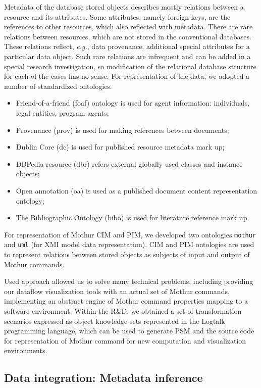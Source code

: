 \documentclass[a4paper]{jpconf}
\begin{document}
Metadata of the database stored objects describes mostly relations between a resource and its attributes.  Some attributes, namely foreign keys, are the references to other resources, which also reflected with metadata.  There are rare relations between resources, which are not stored in the conventional databases.  These relations reflect, \emph{e.g.}, data provenance, additional special attributes for a particular data object.  Such rare relations are infrequent and can be added in a special research investigation, so modification of the relational database structure for each of the cases has no sense. For representation of the data, we adopted a number of standardized ontologies.
\begin{itemize}
\item Friend-of-a-friend (foaf) ontology is used for agent
  information: individuals, legal entities, program agents;
\item Provenance
  (prov) is used for making references between documents;
\item Dublin Core
  (dc) is used for published resource metadata mark up;
\item DBPedia
  resource ({dbr}) refers external globally used classes and instance
  objects;
\item Open annotation ({oa}) is used as a published document
  content representation ontology;
\item The Bibliographic Ontology ({bibo})
  is used for literature reference mark up.
\end{itemize}
For representation of Mothur CIM and PIM, we developed two ontologies
  \texttt{mothur} and \texttt{uml} (for XMI model data
  representation).  CIM and PIM ontologies are used to represent
  relations between stored objects as subjects of input and output of
  Mothur commands.

Used approach allowed us to solve many technical problems, including providing our dataflow visualization tools with an actual set of Mothur commands, implementing an abstract engine of Mothur command properties mapping to a software environment. Within the R\&D, we obtained a set of transformation scenarios expressed as object knowledge sets represented in the Logtalk \cite{logtalk} programming language, which can be used to generate PSM and the source code for representation of Mothur command for new computation and visualization environments.

\subsection{Data integration: Metadata inference}
\end{document}
